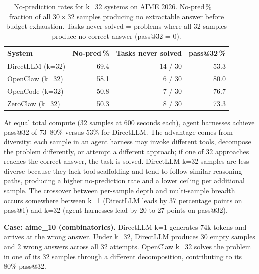 \begin{table}[t]
\centering
\small
\caption{%
  No-prediction rates for k=32 systems on AIME 2026.
  No-pred\,\% = fraction of all $30{\times}32$ samples producing no
  extractable answer before budget exhaustion.
  Tasks never solved = problems where all 32 samples produce no correct
  answer (pass@32 = 0).
}
\label{tab:aime-nopred}
\setlength{\tabcolsep}{4pt}
\begin{tabular}{lrrr}
\toprule
System & No-pred\,\% & Tasks never solved & pass@32\,\% \\
\midrule
DirectLLM (k=32) & 69.4 & 14 / 30 & 53.3 \\
OpenClaw  (k=32) & 58.1 &  6 / 30 & 80.0 \\
OpenCode  (k=32) & 50.8 &  7 / 30 & 76.7 \\
ZeroClaw  (k=32) & 50.3 &  8 / 30 & 73.3 \\
\bottomrule
\end{tabular}
\end{table}


At equal total compute (32 samples at 600 seconds each), agent harnesses
achieve pass@32 of 73--80\% versus 53\% for DirectLLM.
The advantage comes from diversity: each sample in an agent harness may
invoke different tools, decompose the problem differently, or attempt a
different approach; if one of 32 approaches reaches the correct answer, the
task is solved.
DirectLLM k=32 samples are less diverse because they lack tool scaffolding
and tend to follow similar reasoning paths, producing a higher no-prediction
rate and a lower ceiling per additional sample.
The crossover between per-sample depth and multi-sample breadth occurs
somewhere between k=1 (DirectLLM leads by 37 percentage points on pass@1)
and k=32 (agent harnesses lead by 20 to 27 points on pass@32).

\textbf{Case: aime\_10 (combinatorics).}
DirectLLM k=1 generates 74k tokens and arrives at the wrong answer.
Under k=32, DirectLLM produces 30 empty samples and 2 wrong answers across
all 32 attempts.
OpenClaw k=32 solves the problem in one of its 32 samples through a different
decomposition, contributing to its 80\% pass@32.


